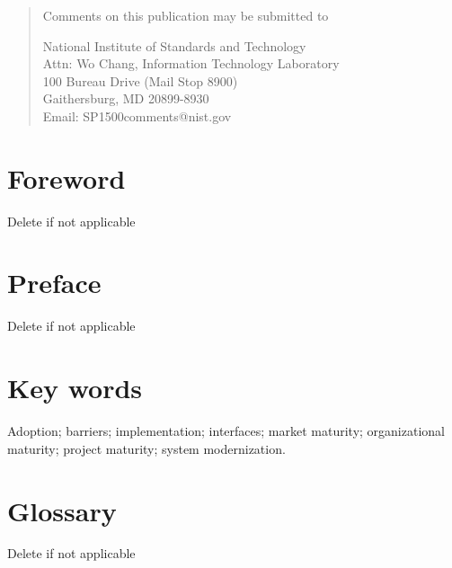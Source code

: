 \documentclass[12pt]{article}
\begin{document}
\begin{titlepage}
\bigskip
\bigskip
\bigskip

\begin{quote}
Comments on this publication may be submitted to 

National Institute of Standards and Technology \\
Attn: Wo Chang, Information Technology Laboratory\\
100 Bureau Drive (Mail Stop 8900)\\ Gaithersburg, MD 20899-8930\\
Email: SP1500comments@nist.gov
\end{quote}

\vfill

\end{titlepage}
\section*{Foreword}
\normalsize Delete if not applicable\\
\section*{Preface}
\normalsize Delete if not applicable\\



\section*{Key words}
\normalsize 
Adoption; barriers; implementation; interfaces; market maturity; organizational maturity; project maturity; system modernization.\\

\pagebreak
\tableofcontents 
	
\listoftables

\listoffigures

\pagebreak

\section*{Glossary}
Delete if not applicable\\
\pagebreak
\end{document}
